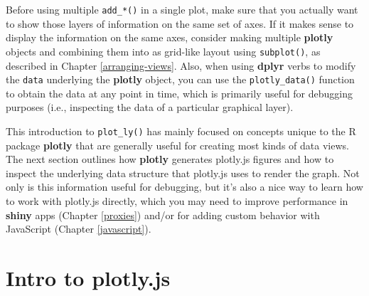 \documentclass[
  12pt,
]{krantz}
\newenvironment{Shaded}{\begin{snugshade}}{\end{snugshade}}
\newcommand{\CommentTok}[1]{\textcolor[rgb]{0.56,0.35,0.01}{\textit{#1}}}
\newcommand{\DataTypeTok}[1]{\textcolor[rgb]{0.13,0.29,0.53}{#1}}
\newcommand{\KeywordTok}[1]{\textcolor[rgb]{0.13,0.29,0.53}{\textbf{#1}}}
\newcommand{\NormalTok}[1]{#1}
\newcommand{\OperatorTok}[1]{\textcolor[rgb]{0.81,0.36,0.00}{\textbf{#1}}}
\newcommand{\StringTok}[1]{\textcolor[rgb]{0.31,0.60,0.02}{#1}}
\begin{document}
Before using multiple \texttt{add\_*()} in a single plot, make sure that you actually want to show those layers of information on the same set of axes. If it makes sense to display the information on the same axes, consider making multiple \textbf{plotly} objects and combining them into as grid-like layout using \texttt{subplot()}, as described in Chapter \ref{arranging-views}. Also, when using \textbf{dplyr} verbs to modify the \texttt{data} underlying the \textbf{plotly} object, you can use the \texttt{plotly\_data()} function to obtain the data at any point in time, which is primarily useful for debugging purposes (i.e., inspecting the data of a particular graphical layer).

\begin{Shaded}
\end{Shaded}

This introduction to \texttt{plot\_ly()} has mainly focused on concepts unique to the R package \textbf{plotly} that are generally useful for creating most kinds of data views. The next section outlines how \textbf{plotly} generates plotly.js figures and how to inspect the underlying data structure that plotly.js uses to render the graph. Not only is this information useful for debugging, but it's also a nice way to learn how to work with plotly.js directly, which you may need to improve performance in \textbf{shiny} apps (Chapter \ref{proxies}) and/or for adding custom behavior with JavaScript (Chapter \ref{javascript}).

\hypertarget{intro-plotly-js}{%
\section{Intro to plotly.js}\label{intro-plotly-js}}
\end{document}

